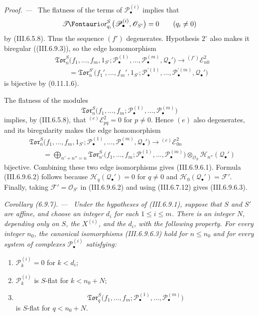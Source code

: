 \documentclass[10pt,oneside]{book}
\newcommand{\sh}[1]{\mathscr{#1}}
\newcommand{\shTor}{\sh{T}\textup{\kern-2.2pt{\Fontauri\slshape or}}}
\newcommand{\sref}[2][]{(#2)}
\newenvironment{corollary}[1][]{\par\medskip\noindent\itshape Corollary (#1). ---\ }{\par}
\newenvironment{proof}{\par\medskip\noindent\textit{Proof. ---\ }}{\par}
\begin{document}
\begin{proof}
The flatness of the terms of $\sh P_\bullet^{(i)}$ implies that
\[
  \shTor_{q_i}^S
  \bigl(
    \sh P_\bullet^{(i)},\sh O_{S'}
  \bigr)
  =
  0
  \qquad(q_i\neq0)
\]
by \sref{III.6.5.8}.  Thus the sequence $(f')$ degenerates.
Hypothesis $2^\circ$ also makes it biregular
(\sref{III.6.9.3}), so the edge homomorphism
\[
\begin{split}
  &
  \mathfrak{Tor}_n^S
  \bigl(
    f_1,\ldots,f_m,1_{S'};
    \sh P_\bullet^{(1)},\ldots,\sh P_\bullet^{(m)},
    \sh Q_\bullet'
  \bigr)
  \longrightarrow
  {}^{(f')}\sh E_{n0}^2
  \\
  &\qquad =
  \mathfrak{Tor}_n^{S'}
  \bigl(
    f_1',\ldots,f_m',1_{S'};
    \sh P_\bullet^{\prime(1)},\ldots,
    \sh P_\bullet^{\prime(m)},\sh Q_\bullet'
  \bigr)
\end{split}
  \tag{6.9.6.4}\label{III.6.9.6.4.eq}
\]
is bijective by \sref[0]{0.11.1.6}.

The flatness of the modules
\[
  \mathfrak{Tor}_n^S
  \bigl(
    f_1,\ldots,f_m;
    \sh P_\bullet^{(1)},\ldots,\sh P_\bullet^{(m)}
  \bigr)
\]
implies, by \sref{III.6.5.8}, that
${}^{(e)}\sh E_{pq}^2=0$ for $p\neq0$.  Hence $(e)$ also
degenerates, and its biregularity makes the edge homomorphism
\[
\begin{split}
  &
  \mathfrak{Tor}_n^S
  \bigl(
    f_1,\ldots,f_m,1_{S'};
    \sh P_\bullet^{(1)},\ldots,\sh P_\bullet^{(m)},
    \sh Q_\bullet'
  \bigr)
  \longrightarrow
  {}^{(e)}\sh E_{0n}^2
  \\
  &\qquad =
  \bigoplus_{n'+n''=n}
  \mathfrak{Tor}_{n'}^S
  \bigl(
    f_1,\ldots,f_m;
    \sh P_\bullet^{(1)},\ldots,\sh P_\bullet^{(m)}
  \bigr)
  \otimes_{\sh O_S}
  \sh H_{n''}(\sh Q_\bullet')
\end{split}
  \tag{6.9.6.5}\label{III.6.9.6.5.eq}
\]
bijective.  Combining these two edge isomorphisms gives
\sref{III.6.9.6.1}.  Formula \sref{III.6.9.6.2} follows because
$\sh H_q(\sh Q_\bullet')=0$ for $q\neq0$ and
$\sh H_0(\sh Q_\bullet')=\sh F'$.  Finally, taking
$\sh F'=\sh O_{S'}$ in \sref{III.6.9.6.2} and using
\sref{III.6.7.12} gives \sref{III.6.9.6.3}.
\end{proof}

\begin{corollary}[6.9.7]
\label{III.6.9.7}
Under the hypotheses of \sref{III.6.9.1}, suppose that $S$ and
$S'$ are affine, and choose an integer $d_i$ for each
$1\leq i\leq m$.  There is an integer $N$, depending only on $S$,
the $X^{(i)}$, and the $d_i$, with the following property.  For
every integer $n_0$, the canonical isomorphisms
\sref{III.6.9.6.3} hold for $n\leq n_0$ and for every system of
complexes $\sh P_\bullet^{(i)}$ satisfying:
\begin{enumerate}
  \item[$1^\circ$] $\sh P_k^{(i)}=0$ for $k<d_i$;
  \item[$2^\circ$] $\sh P_k^{(i)}$ is $S$-flat for
  $k<n_0+N$;
  \item[$3^\circ$]
  \[
    \mathfrak{Tor}_q^S
    \bigl(
      f_1,\ldots,f_m;
      \sh P_\bullet^{(1)},\ldots,\sh P_\bullet^{(m)}
    \bigr)
  \]
  is $S$-flat for $q<n_0+N$.
\end{enumerate}
\end{corollary}
\end{document}
